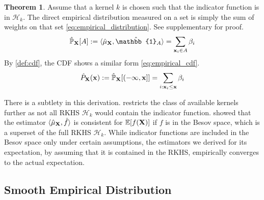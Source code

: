 \documentclass[twoside]{article} \usepackage{aistats2017}
\theoremstyle{definition}
\theoremstyle{theorem}
\newtheorem{theorem}{Theorem}[section]
\newcommand{\rv}[1]{{#1}}
\newcommand{\inner}[2]{{\langle #1, #2 \rangle}}
\begin{document}
		\begin{theorem} \label{thm:empirical_distribution_and_cdf}
			Assume that a kernel $k$ is chosen such that the indicator function is in $\mathcal{H}_{k}$. The direct empirical distribution measured on a set is simply the sum of weights on that set \eqref{eq:empirical_distribution}. See supplementary for proof.
			\begin{equation}
				\hat{\mathbb{P}}_{\bvec{\rv{X}}}[A] := \inner{\hat{\mu}_{\bvec{\rv{X}}}}{ \hat{\mathbb{1}}_{A}} = \sum_{\bvec{x}_{i} \in A} \beta_{i}
			\label{eq:empirical_distribution}
			\end{equation}
			By \cref{def:cdf}, the CDF shows a similar form \eqref{eq:empirical_cdf}.
			\begin{equation}
				\hat{P}_{\bvec{\rv{X}}}(\bvec{x}) := \hat{\mathbb{P}}_{\bvec{\rv{X}}}[(-\bvec{\infty}, \bvec{x}]] = \sum_{i : \bvec{x}_{i} \leq \bvec{x}} \beta_{i}
			\label{eq:empirical_cdf}
			\end{equation}
		\end{theorem}

		There is a subtlety in this derivation.  restricts the class of available kernels further as not all RKHS $\mathcal{H}_{k}$ would contain the indicator function. \cite{kanagawa2014recovering} showed that the estimator $\langle \hat{\mu}_{\bvec{\rv{X}}}, \hat{f} \rangle$ is consistent for $\mathbb{E}[f(\bvec{\rv{X}})]$ if $f$ is in the Besov space, which is a superset of the full RKHS $\mathcal{H}_{k}$. While indicator functions are included in the Besov space only under certain assumptions, the estimators we derived for its expectation, by assuming that it is contained in the RKHS, empirically converges to the actual expectation.

	\subsection{Smooth Empirical Distribution}
	\label{sec:direct_quantile_regression:smooth_empirical_distribution}
\end{document}
